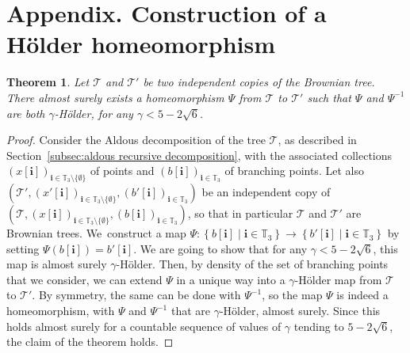 \documentclass[11pt]{article}
\let\backslash\setminus
\newcommand{\enstq}[2]{\left\lbrace#1\mathrel{}\middle|\mathrel{}#2\right\rbrace}
\newcommand{\Tt}{\mathcal{T}}
\newcommand{\ii}{\mathbf{i}}
\theoremstyle{plain}
\newtheorem{theorem}{Theorem}
\theoremstyle{definition}
\numberwithin{equation}{section}
\begin{document}
\appendix

\section*{Appendix. Construction of a Hölder homeomorphism}
\label{app:construction of homeomorphism}

\begin{theorem}\label{thm:existence_holder_homeomorphism}
Let $\Tt$ and $\Tt'$ be two independent copies of the Brownian tree.
There almost surely exists a homeomorphism $\Psi$ from $\Tt$ to $\Tt'$ such that $\Psi$ and $\Psi^{-1}$ are both $\gamma$-Hölder, for any $\gamma < 5-2\sqrt{6}$.
\end{theorem}
\begin{proof}
Consider the Aldous decomposition of the tree $\mathcal{T}$, as described in Section~\ref{subsec:aldous recursive decomposition}, with the associated collections $(x[\ii])_{\ii \in \mathbb{T}_3 \backslash \{ \emptyset\}}$ of points and $(b[\ii])_{\ii\in \mathbb T_3}$ of branching points.
Let also $\left( \mathcal{T}', (x'[\ii])_{\ii \in \mathbb{T}_3 \backslash \{ \emptyset\}}, (b'[\ii])_{\ii\in \mathbb T_3} \right)$ be an independent copy of $\left( \mathcal{T}, (x[\ii])_{\ii \in \mathbb{T}_3 \backslash \{ \emptyset\}}, (b[\ii])_{\ii\in \mathbb T_3} \right)$, so that in particular $\Tt$ and $\Tt'$ are Brownian trees.
We~construct a map $\Psi : \enstq{b[\ii]}{ \ii\in \mathbb T_3} \rightarrow \enstq{b'[\ii]}{\ii\in \mathbb T_3}$ by setting $\Psi(b[\ii])= b'[\ii]$.
We are going to show that for any $\gamma < 5-2\sqrt{6}$, this map is almost surely $\gamma$-Hölder.
Then, by density of the set of branching points that we consider, we can extend $\Psi$ in a unique way into a $\gamma$-Hölder map from $\Tt$ to $\Tt'$.
By symmetry, the same can be done with $\Psi^{-1}$, so the map $\Psi$ is indeed a homeomorphism, with $\Psi$ and $\Psi^{-1}$ that are $\gamma$-Hölder, almost surely.
Since this holds almost surely for a countable sequence of values of $\gamma$ tending to $5-2\sqrt{6}$, the claim of the theorem holds.


\end{proof}
\end{document}
